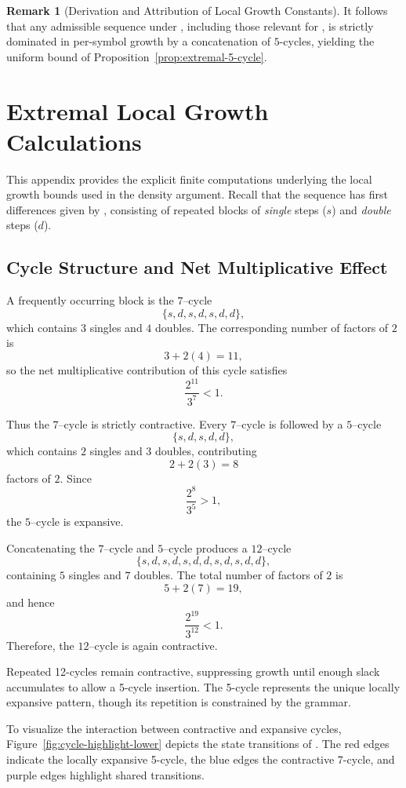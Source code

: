 \documentclass[12pt, oneside]{article}   	%
\numberwithin{equation}{section}          %
\theoremstyle{definition}
\newtheorem*{remark}{Remark}
\begin{document}
\begin{remark}[Derivation and Attribution of Local Growth Constants]
It follows that any admissible sequence under , including those
relevant for , is strictly dominated in per-symbol growth by a
concatenation of $5$-cycles, yielding the uniform bound of
Proposition~\ref{prop:extremal-5-cycle}.
\end{remark}


\newpage
\section{Extremal Local Growth Calculations}
\label{app:local-growth-details}

This appendix provides the explicit finite computations underlying the local
growth bounds used in the density argument. Recall that the sequence 
has first differences given by , consisting of repeated blocks of
\emph{single} steps ($s$) and \emph{double} steps ($d$).

\subsection{Cycle Structure and Net Multiplicative Effect}

A frequently occurring block is the $7$--cycle
\[
\{ s, d, s, d, s, d, d \},
\]
which contains $3$ singles and $4$ doubles.  The corresponding number of
factors of $2$ is
\[
3 + 2(4) = 11,
\]
so the net multiplicative contribution of this cycle satisfies
\[
\frac{2^{11}}{3^7} < 1.
\]

Thus the $7$--cycle is strictly contractive. Every $7$--cycle is followed by a $5$--cycle
\[
\{ s, d, s, d, d \},
\]
which contains $2$ singles and $3$ doubles, contributing
\[
2 + 2(3) = 8
\]
factors of $2$.  Since
\[
\frac{2^8}{3^5} > 1,
\]
the $5$--cycle is expansive.

Concatenating the $7$--cycle and $5$--cycle produces a $12$--cycle
\[
\{ s, d, s, d, s, d, d, s, d, s, d, d \},
\]
containing $5$ singles and $7$ doubles.  The total number of factors of $2$ is
\[
5 + 2(7) = 19,
\]
and hence
\[
\frac{2^{19}}{3^{12}} < 1.
\]
Therefore, the $12$--cycle is again contractive.

Repeated 12-cycles remain contractive, suppressing growth until enough
slack accumulates to allow a 5-cycle insertion. The 5-cycle represents the
unique locally expansive pattern, though its repetition is constrained by
the grammar.

To visualize the interaction between contractive and expansive cycles,
Figure~\ref{fig:cycle-highlight-lower} depicts the state transitions of
. The red edges indicate the locally expansive 5-cycle, the
blue edges the contractive 7-cycle, and purple edges highlight shared transitions.
\end{document}
